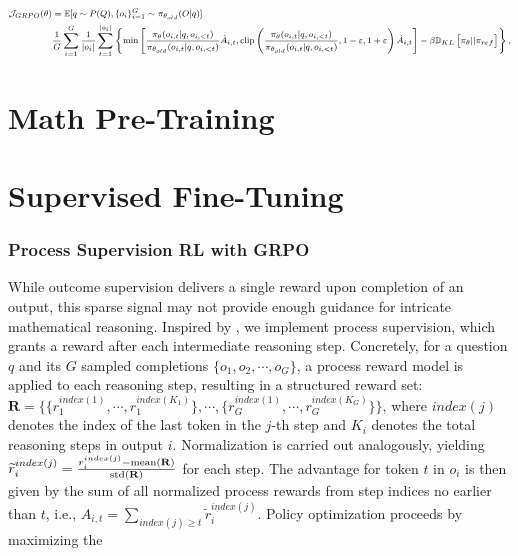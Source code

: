\begin{equation}
\footnotesize
\begin{split}
    \mathcal{J}_{GRPO}(\theta) &= \mathbb{E}{[q \sim P(Q), \{o_i\}_{i=1}^G \sim \pi_{\theta_{old}}(O|q)]}  \\
    & \frac{1}{G}\sum_{i=1}^G\frac{1}{|o_i|} \sum_{t=1}^{|o_i|} \left\{ \min \left[ \frac{\pi_\theta(o_{i,t} | q, o_{i,<t})}{\pi_{\theta_{old}}(o_{i,t} | q, o_{i,<t})} \hat{A}_{i,t}, \text{clip} \left( \frac{\pi_\theta(o_{i,t} | q, o_{i,<t})}{\pi_{\theta_{old}}(o_{i,t} | q, o_{i,<t})}, 1 - \varepsilon, 1 + \varepsilon \right)  \hat{A}_{i,t} \right] - \beta \mathbb{D}_{KL}\left[\pi_{\theta} || \pi_{ref}\right]\right\} ,
\end{split}
\label{eq:GRPO-obj}
\end{equation}

\section{Math Pre-Training}

\section{Supervised Fine-Tuning}

\subsubsection{Process Supervision RL with GRPO} While outcome supervision delivers a single reward upon completion of an output, this sparse signal may not provide enough guidance for intricate mathematical reasoning. Inspired by \cite{wang2023math}, we implement process supervision, which grants a reward after each intermediate reasoning step. Concretely, for a question $q$ and its $G$ sampled completions $\{o_1, o_2, \cdots, o_G\}$, a process reward model is applied to each reasoning step, resulting in a structured reward set: $\mathbf{R} = \{ \{r_1^{index(1)},\cdots,r_1^{index(K_1)}\}, \cdots,  \{r_G^{index(1)},\cdots,r_G^{index(K_G)}\} \}$, where $index(j)$ denotes the index of the last token in the $j$-th step and $K_i$ denotes the total reasoning steps in output $i$. Normalization is carried out analogously, yielding $\widetilde{r}_i^{index(j)} = \frac{r_i^{index(j)} - {\rm mean(\mathbf{R})}}{{\rm std(\mathbf{R})}}$ for each step. The advantage for token $t$ in $o_i$ is then given by the sum of all normalized process rewards from step indices no earlier than $t$, i.e., $\hat{A}_{i, t} = \sum_{index(j) \ge t} \widetilde{r}_i^{index(j)}$. Policy optimization proceeds by maximizing the

